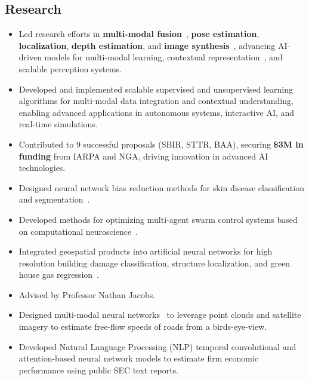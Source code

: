 \documentclass[11pt,a4paper,sans]{moderncv} %
\begin{document}
\subsection{Research}
{
\begin{itemize} 
	\item Led research efforts in \textbf{multi-modal fusion}~\cite{greenwell2024watch}, \textbf{pose estimation}, \textbf{localization}, \textbf{depth estimation}, and \textbf{image synthesis}~\cite{Low2High}, advancing AI-driven models for multi-modal learning, contextual representation~\cite{ProbTraffic}, and scalable perception systems.
	\item Developed and implemented scalable supervised and unsupervised learning algorithms for multi-modal data integration and contextual understanding, enabling advanced applications in autonomous systems, interactive AI, and real-time simulations.
	\item Contributed to 9 successful proposals (SBIR, STTR, BAA), securing \textbf{\$3M in funding} from IARPA and NGA, driving innovation in advanced AI technologies.
\end{itemize}
}
{
\begin{itemize} 
	\item Designed neural network bias reduction methods for skin disease classification and segmentation~\cite{yuan2023edgemixup, paul2022tara}.
	\item Developed methods for optimizing multi-agent swarm control systems based on computational neuroscience~\cite{hadzic2022100218, buckley2021interdisciplinary}.
	\item Integrated geospatial products into artificial neural networks for high resolution building damage classification, structure localization, and green house gas regression~\cite{mukherjee2021towards}.  
\end{itemize}
}
{
\begin{itemize} 
	\item Advised by Professor Nathan Jacobs.
	\item Designed multi-modal neural networks~\cite{RasterNetpaper, chen2021safety} to leverage point clouds and satellite imagery to estimate free-flow speeds of roads from a birds-eye-view.
	\item Developed Natural Language Processing (NLP) temporal convolutional and attention-based neural network models to estimate firm economic performance using public SEC text reports. 
\end{itemize}
}
\end{document}
